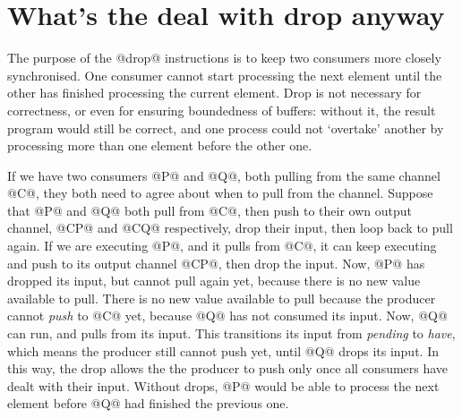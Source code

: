 
\section{What's the deal with drop anyway}

The purpose of the @drop@ instructions is to keep two consumers more closely synchronised.
One consumer cannot start processing the next element until the other has finished processing the current element.
Drop is not necessary for correctness, or even for ensuring boundedness of buffers: without it, the result program would still be correct, and one process could not `overtake' another by processing more than one element before the other one.

If we have two consumers @P@ and @Q@, both pulling from the same channel @C@, they both need to agree about when to pull from the channel.
Suppose that @P@ and @Q@ both pull from @C@, then push to their own output channel, @CP@ and @CQ@ respectively, drop their input, then loop back to pull again.
If we are executing @P@, and it pulls from @C@, it can keep executing and push to its output channel @CP@, then drop the input.
Now, @P@ has dropped its input, but cannot pull again yet, because there is no new value available to pull.
There is no new value available to pull because the producer cannot \emph{push} to @C@ yet, because @Q@ has not consumed its input.
Now, @Q@ can run, and pulls from its input.
This transitions its input from \emph{pending} to \emph{have}, which means the producer still cannot push yet, until @Q@ drops its input.
In this way, the drop allows the the producer to push only once all consumers have dealt with their input.
Without drops, @P@ would be able to process the next element before @Q@ had finished the previous one.

